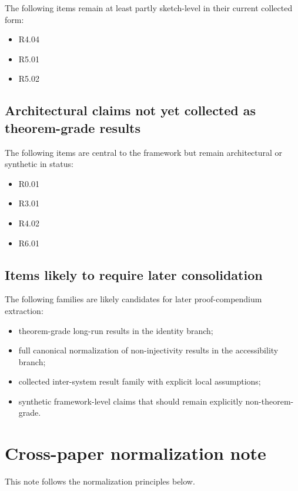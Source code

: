 \documentclass[12pt]{article}
\begin{document}
	The following items remain at least partly sketch-level in their current collected form:
	\begin{itemize}[leftmargin=2em]
		\item R4.04
		\item R5.01
		\item R5.02
	\end{itemize}
	
	\subsection{Architectural claims not yet collected as theorem-grade results}
	
	The following items are central to the framework but remain architectural or synthetic in status:
	\begin{itemize}[leftmargin=2em]
		\item R0.01
		\item R3.01
		\item R4.02
		\item R6.01
	\end{itemize}
	
	\subsection{Items likely to require later consolidation}
	
	The following families are likely candidates for later proof-compendium extraction:
	\begin{itemize}[leftmargin=2em]
		\item theorem-grade long-run results in the identity branch;
		\item full canonical normalization of non-injectivity results in the accessibility branch;
		\item collected inter-system result family with explicit local assumptions;
		\item synthetic framework-level claims that should remain explicitly non-theorem-grade.
	\end{itemize}
	
	\section{Cross-paper normalization note}
	
	This note follows the normalization principles below.
	
\end{document}
